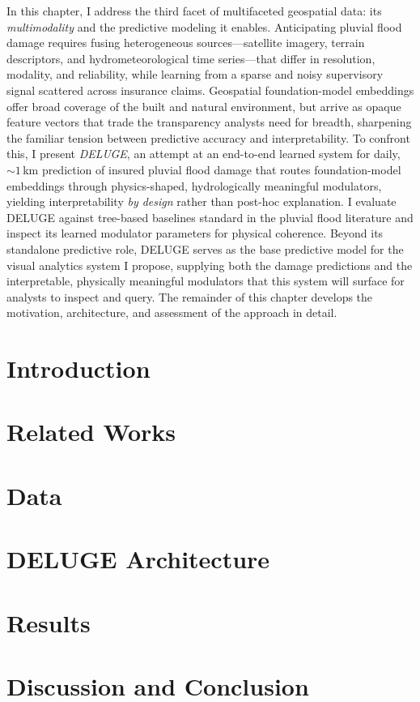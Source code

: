 
In this chapter, I address the third facet of multifaceted geospatial data: its \emph{multimodality} and the predictive modeling it enables.
%
Anticipating pluvial flood damage requires fusing heterogeneous sources---satellite imagery, terrain descriptors, and hydrometeorological time series---that differ in resolution, modality, and reliability, while learning from a sparse and noisy supervisory signal scattered across insurance claims.
%
Geospatial foundation-model embeddings offer broad coverage of the built and natural environment, but arrive as opaque feature vectors that trade the transparency analysts need for breadth, sharpening the familiar tension between predictive accuracy and interpretability.
%
To confront this, I present \emph{DELUGE}, an attempt at an end-to-end learned system for daily, ${\sim}1$\,km prediction of insured pluvial flood damage that routes foundation-model embeddings through physics-shaped, hydrologically meaningful modulators, yielding interpretability \emph{by design} rather than post-hoc explanation.
%
I evaluate DELUGE against tree-based baselines standard in the pluvial flood literature and inspect its learned modulator parameters for physical coherence.
%
Beyond its standalone predictive role, DELUGE serves as the base predictive model for the visual analytics system I propose, supplying both the damage predictions and the interpretable, physically meaningful modulators that this system will surface for analysts to inspect and query.
%
The remainder of this chapter develops the motivation, architecture, and assessment of the approach in detail.

\section{Introduction}

\section{Related Works}

\section{Data}

% 
\section{DELUGE Architecture}


\section{Results}

\section{Discussion and Conclusion}

